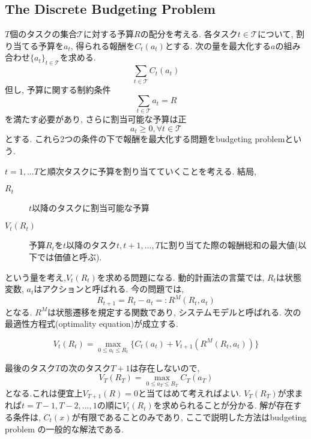 \documentclass[11pt]{jsbook}
\begin{document}
\subsection{The Discrete Budgeting Problem}
$T$個のタスクの集合$\mathcal{T}$に対する予算$R$の配分を考える.
各タスク$t \in \mathcal{T}$について, 割り当てる予算を$a_t$, 得られる報酬を$C_t(a_t)$とする.
次の量を最大化する$a$の組み合わせ$\{a_t\}_{t \in \mathcal{T}}$を求める.
\begin{equation}
	\sum_{t \in \mathcal{T}} C_t(a_t)
\end{equation}
但し, 予算に関する制約条件
\begin{equation}
	\sum_{t \in \mathcal{T}} a_t = R
\end{equation}
を満たす必要があり, さらに割当可能な予算は正
\begin{equation}
	a_t \ge 0, \forall t \in \mathcal{T}
\end{equation}
とする. これら2つの条件の下で報酬を最大化する問題をbudgeting problemという.

$t=1,...T$と順次タスクに予算を割り当てていくことを考える. 結局, 
\begin{description}
	\item[$R_t$] $t$以降のタスクに割当可能な予算
	\item[$V_t(R_t)$] 予算$R_t$を$t$以降のタスク$t, t+1, \dots, T$に割り当てた際の報酬総和の最大値(以下では価値と呼ぶ).
\end{description}
という量を考え,$V_t(R_t)$を求める問題になる.
動的計画法の言葉では, $R_t$は状態変数, $a_t$はアクションと呼ばれる.
今の問題では,
\begin{equation}
	R_{t+1} = R_t - a_t =: R^M(R_t, a_t)
\end{equation}
となる. $R^M$は状態遷移を規定する関数であり, システムモデルと呼ばれる.
次の最適性方程式(optimality equation)が成立する.

\begin{equation}
	V_t(R_t) = \max_{0 \le a_t \le R_t} \{C_t(a_t) + V_{t+1}(R^M(R_t, a_t)) \}
\end{equation}

最後のタスク$T$の次のタスク$T+1$は存在しないので,
\begin{equation}
	V_T(R_T) = \max_{0 \le a_T \le R_T} C_T(a_T)
\end{equation}
となる.これは便宜上$V_{T+1}(R) = 0$と当てはめて考えればよい.
$V_T(R_T)$が求まれば$t=T-1, T-2, \dots, 1$の順に$V_t(R_t)$を求められることが分かる.
解が存在する条件は, $C_t(x)$が有限であることのみであり, ここで説明した方法はbudgeting problem の一般的な解法である.
\end{document}
